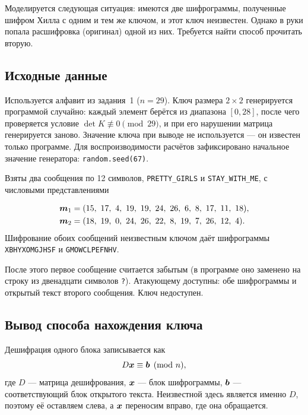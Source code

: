 \documentclass[a4paper,14pt]{extarticle}
\begin{document}
Моделируется следующая ситуация: имеются две шифрограммы, полученные шифром Хилла
с одним и тем же ключом, и этот ключ неизвестен. Однако в руки попала расшифровка
(оригинал) одной из них. Требуется найти способ прочитать вторую.

\subsection{Исходные данные}

Используется алфавит из задания~1 ($n = 29$). Ключ размера $2\times2$ генерируется
программой случайно: каждый элемент берётся из диапазона $[0, 28]$, после чего
проверяется условие $\det K \not\equiv 0 \pmod{29}$, и при его нарушении матрица
генерируется заново. Значение ключа при выводе не используется --- он известен
только программе. Для воспроизводимости расчётов зафиксировано начальное значение
генератора: \texttt{random.seed(67)}.

Взяты два сообщения по 12 символов, \texttt{PRETTY\_GIRLS} и
\texttt{STAY\_WITH\_ME}, с числовыми представлениями

\begin{equation}
\begin{aligned}
  \vect{m}_1 &= (15,\ 17,\ 4,\ 19,\ 19,\ 24,\ 26,\ 6,\ 8,\ 17,\ 11,\ 18), \\
  \vect{m}_2 &= (18,\ 19,\ 0,\ 24,\ 26,\ 22,\ 8,\ 19,\ 7,\ 26,\ 12,\ 4).
\end{aligned}
\end{equation}
Шифрование обоих сообщений неизвестным ключом даёт шифрограммы
\texttt{XBHYXOMGJHSF} и \texttt{GMOWCLPEFNHV}.

После этого первое сообщение считается забытым (в программе оно заменено на
строку из двенадцати символов \texttt{?}). Атакующему доступны: обе шифрограммы
и открытый текст второго сообщения. Ключ недоступен.

\subsection{Вывод способа нахождения ключа}

Дешифрация одного блока записывается как
\begin{equation}
  D\boldsymbol{x} \equiv \boldsymbol{b} \pmod n ,
  \label{eq:dec2}
\end{equation}
где $D$ --- матрица дешифрования, $\boldsymbol{x}$ --- блок шифрограммы,
$\boldsymbol{b}$ --- соответствующий блок открытого текста. Неизвестной здесь
является именно $D$, поэтому её оставляем слева, а $\boldsymbol{x}$ переносим вправо,
где она обращается.
\end{document}
